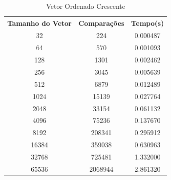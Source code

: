 \documentclass[12pt,a4paper,twoside]{report}
\begin{document}
\begin{table}[h]
  \centering
  \caption{Vetor Ordenado Crescente \label{tab:oc}}
  \begin{tabular}{ccc} \\\hline
  \textbf{Tamanho do Vetor} & \textbf{Comparações} & \textbf{Tempo(s)} \\\hline
  32                        & 224       		  & 0.000487\\\hline
  64                        & 570                  & 0.001093
\\\hline
  128                       & 1301       		  & 0.002462\\\hline
  256                       & 3045       		  & 0.005639
\\\hline
  512                       & 6879                 & 0.012489          \\\hline
  1024                      & 15139			  & 0.027764
\\\hline
  2048                      & 33154			  & 0.061132\\\hline
  4096                      & 75236			  & 0.137670         \\\hline
  8192                      & 208341			  & 0.295912
\\\hline
  16384                     & 359038 	             & 0.630963\\\hline
  32768                     & 725481 	             & 1.332000\\\hline
  65536                    & 2068944	             & 2.861320\\\hline
  \end{tabular}
\end{table}
\end{document}
